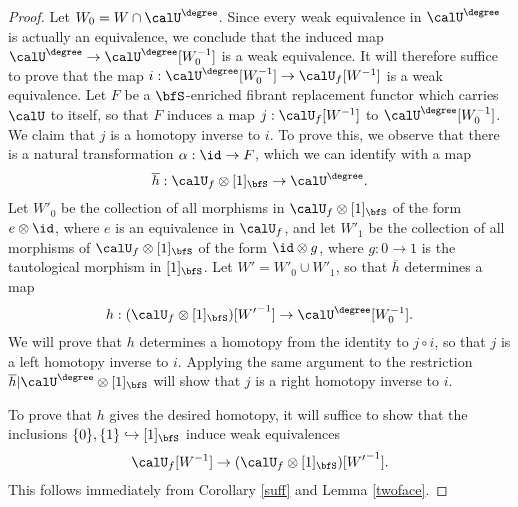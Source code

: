 \begin{proof}
Let $W_0 = W \cap \calU^{\degree}$. Since every weak equivalence in $\calU^{\degree}$
is actually an equivalence, we conclude that the induced map
$\calU^{\degree} \rightarrow \calU^{\degree}[W_0^{-1}]$ is a weak equivalence.
It will therefore suffice to prove that the map
$i: \calU^{\degree}[W_0^{-1}] \rightarrow \calU_{f}[W^{-1}]$ is a weak equivalence.
Let $F$ be a $\bfS$-enriched fibrant replacement functor which carries $\calU$ to itself, so
that $F$ induces a map $j: \calU_{f}[W^{-1}]$ to $\calU^{\degree}[W_0^{-1}]$. We claim that $j$ is a homotopy inverse to $i$. To prove this, we observe that there is a natural transformation
$\alpha: \id \rightarrow F$, which we can identify with a map
$$\overline{h}: \calU_{f} \otimes [1]_{\bfS} \rightarrow \calU^{\degree}.$$
Let $W'_0$ be the collection of all morphisms in $\calU_{f} \otimes [1]_{\bfS}$
of the form $e \otimes \id$, where $e$ is an equivalence in $\calU_{f}$, and let
$W'_1$ be the collection of all morphisms of $\calU_f \otimes [1]_{\bfS}$ of the form
$\id \otimes g$, where $g: 0 \rightarrow 1$ is the tautological morphism in
$[1]_{\bfS}$. Let $W' = W'_0 \cup W'_1$, so that $\overline{h}$ determines a map
$$ h: ( \calU_{f} \otimes [1]_{\bfS} )[{W'}^{-1} ] \rightarrow \calU^{\degree}[W_0^{-1}].$$
We will prove that $h$ determines a homotopy from the identity to $j \circ i$, so that
$j$ is a left homotopy inverse to $i$. Applying the same argument to the
restriction $\overline{h} | \calU^{\degree} \otimes [1]_{\bfS}$ will show that
$j$ is a right homotopy inverse to $i$. 

To prove that $h$ gives the desired homotopy, it will suffice to show that the inclusions
$\{0\}, \{1\} \hookrightarrow [1]_{\bfS}$ induce weak equivalences
$$ \calU_{f}[W^{-1}] \rightarrow (\calU_{f} \otimes [1]_{\bfS})[{W'}^{-1}].$$
This follows immediately from Corollary \ref{suff} and Lemma \ref{twoface}. 
\end{proof}

